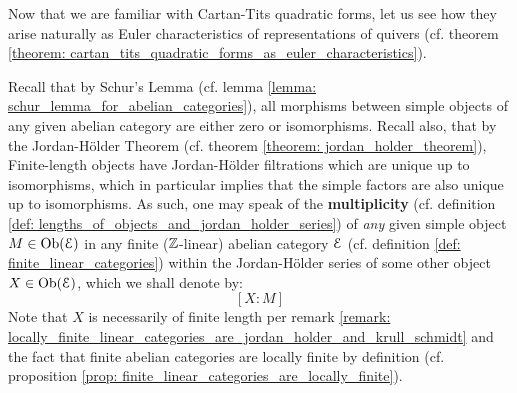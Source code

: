             Now that we are familiar with Cartan-Tits quadratic forms, let us see how they arise naturally as Euler characteristics of representations of quivers (cf. theorem \ref{theorem: cartan_tits_quadratic_forms_as_euler_characteristics}). 
            \begin{convention}
                Recall that by Schur's Lemma (cf. lemma \ref{lemma: schur_lemma_for_abelian_categories}), all morphisms between simple objects of any given abelian category are either zero or isomorphisms. Recall also, that by the Jordan-H\"older Theorem (cf. theorem \ref{theorem: jordan_holder_theorem}), Finite-length objects have Jordan-H\"older filtrations which are unique up to isomorphisms, which in particular implies that the simple factors are also unique up to isomorphisms. As such, one may speak of the \textbf{multiplicity} (cf. definition \ref{def: lengths_of_objects_and_jordan_holder_series}) of \textit{any} given simple object $M \in \mathrm{Ob}(\mathcal{E})$ in any finite ($\mathbb{Z}$-linear) abelian category $\mathcal{E}$ (cf. definition \ref{def: finite_linear_categories}) within the Jordan-H\"older series of some other object $X \in \mathrm{Ob}(\mathcal{E})$, which we shall denote by:
                    $$[X : M]$$
                Note that $X$ is necessarily of finite length per remark \ref{remark: locally_finite_linear_categories_are_jordan_holder_and_krull_schmidt} and the fact that finite abelian categories are locally finite by definition (cf. proposition \ref{prop: finite_linear_categories_are_locally_finite}).
            \end{convention}
            \begin{definition} \label{def: grothendieck_groups}
                
            \end{definition}
            \begin{remark}
                
            \end{remark}
            
            \begin{definition} \label{def: euler_characteristics}
                
            \end{definition}
            \begin{example} \label{example: euler_characteristics_of_quiver_representations}
                
            \end{example}
            
